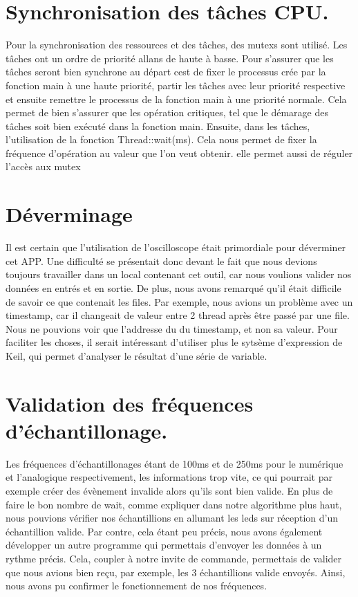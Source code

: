 \documentclass[12pt]{article}
\begin{document}
\section{Synchronisation des tâches CPU.}
Pour la synchronisation des ressources et des tâches, des mutexs sont utilisé. Les tâches ont un ordre de priorité allans de haute à basse. Pour s'assurer que les tâches seront bien synchrone au départ cest de fixer le processus crée par la fonction main à une haute priorité, partir les tâches avec leur priorité respective et ensuite remettre le processus de la fonction main à une priorité normale. Cela permet de bien s'assurer que les opération critiques, tel que le démarage des tâches soit bien exécuté dans la fonction main. Ensuite, dans les tâches, l'utilisation de la fonction Thread::wait(ms). Cela nous permet de fixer la fréquence d'opération au valeur que l'on veut obtenir. elle permet aussi de réguler l'accès aux mutex 

\section{Déverminage}
Il est certain que l'utilisation de l'oscilloscope était primordiale pour déverminer cet APP. Une difficulté se présentait donc devant le fait que nous devions toujours travailler dans un local contenant cet outil, car nous voulions valider nos données en entrés et en sortie. De plus, nous avons remarqué qu'il était difficile de savoir ce que contenait les files. Par exemple, nous avions un problème avec un timestamp, car il changeait de valeur entre 2 thread après être passé par une file. Nous ne pouvions voir que l'addresse du du timestamp, et non sa valeur. Pour faciliter les choses, il serait intéressant d'utiliser plus le sytsème d'expression de Keil, qui permet d'analyser le résultat d'une série de variable. 

\section{Validation des fréquences d'échantillonage.}
Les fréquences d'échantillonages étant de 100ms et de 250ms pour le numérique et l'analogique respectivement, les informations trop vite, ce qui pourrait par exemple créer des évènement invalide alors qu'ils sont bien valide. En plus de faire le bon nombre de wait, comme expliquer dans notre algorithme plus haut, nous pouvions vérifier nos échantillions en allumant les leds sur réception d'un échantillion valide. Par contre, cela étant peu précis, nous avons également développer un autre programme qui permettais d'envoyer les données à un rythme précis. Cela, coupler à notre invite de commande, permettais de valider que nous avions bien reçu, par exemple, les 3 échantillions valide envoyés. Ainsi, nous avons pu confirmer le fonctionnement de nos fréquences.
\end{document}
